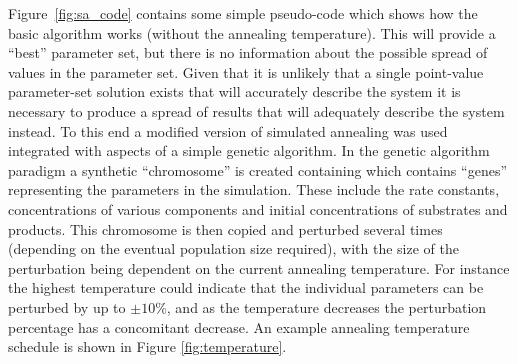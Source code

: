 Figure~\ref{fig:sa_code} contains some simple pseudo-code which shows how the basic algorithm works (without the annealing temperature). This will provide a ``best'' parameter set, but there is no information about the possible spread of values in the parameter set. Given that it is unlikely that a single point-value parameter-set solution exists that will accurately describe the system it is necessary to produce a spread of results that will adequately describe the system instead. To this end a modified version of simulated annealing was used integrated with aspects of a simple genetic algorithm. In the genetic algorithm paradigm a synthetic ``chromosome'' is created containing which contains ``genes'' representing the parameters in the simulation. These include the rate constants, concentrations of various components and initial concentrations of substrates and products. This chromosome is then copied and perturbed several times (depending on the eventual population size required), with the size of the perturbation being dependent on the current annealing temperature. For instance the highest temperature could indicate that the individual parameters can be perturbed by up to $\pm 10\%$, and as the temperature decreases the perturbation percentage has a concomitant decrease. An example annealing temperature schedule is shown in Figure \ref{fig:temperature}.
